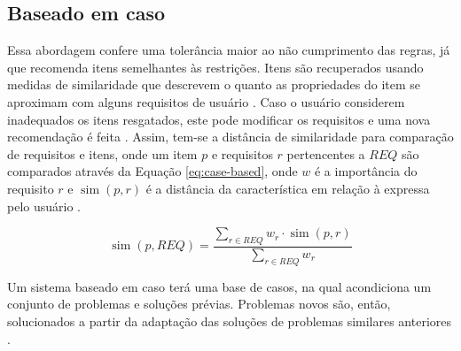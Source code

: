     
    
\subsection{Baseado em caso}
    Essa abordagem confere uma tolerância maior ao não cumprimento das regras, já que recomenda itens semelhantes às restrições. Itens são recuperados usando medidas de similaridade que descrevem o quanto as propriedades do item se aproximam com alguns requisitos de usuário \cite{Aggarwal2016}. Caso o usuário considerem inadequados os itens resgatados, este pode modificar os requisitos e uma nova recomendação é feita \cite{Lorenzi2005}.
    Assim, tem-se a distância de similaridade para comparação de requisitos e itens, onde um item $p$ e requisitos $r$ pertencentes a $REQ$ são comparados através da Equação \ref{eq:case-based}, onde $w$ é a importância do requisito $r$ e $\operatorname{sim}(p, r)$ é a distância da característica em relação à expressa pelo usuário \cite{Jannach2010}. 
    
    \begin{equation}
        \operatorname{sim}(p, REQ) = \frac{\sum_{r \in REQ}w_r \cdot \operatorname{sim}(p,r)}{\sum_{r \in REQ}w_r} \label{eq:case-based}
    \end{equation}
    
    Um sistema baseado em caso terá uma base de casos, na qual acondiciona um conjunto de problemas e soluções prévias. Problemas novos são, então, solucionados a partir da adaptação das soluções de problemas similares anteriores \cite{Bridge2005}. 
            
